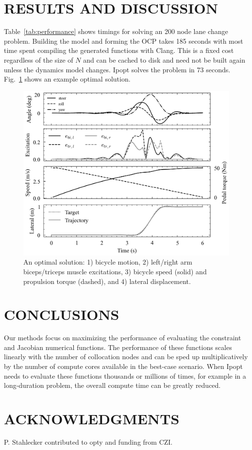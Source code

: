 \documentclass[11pt,twocolumn]{article}
\begin{document}
\section*{RESULTS AND DISCUSSION}
\vspace{-1em}
\pagestyle{empty}
%
Table~\ref{tab:performance} shows timings for solving an 200 node lane change
problem. Building the model and forming the OCP takes 185 seconds with most time
spent compiling the generated functions with Clang. This is a fixed cost
regardless of the size of \(N\) and can be cached to disk and need not be built
again unless the dynamics model changes. Ipopt solves the problem in 73 seconds.
Fig.~\ref{fig:trajectories} shows an example optimal solution.
%
\begin{figure}
    \centering
    \includegraphics[width=\linewidth]{figures/arm-muscle-bicycle-excitation.png}
    \caption{\small An optimal solution: 1) bicycle motion, 2) left/right
    arm biceps/triceps muscle excitations, 3) bicycle speed (solid) and
    propulsion torque (dashed), and 4) lateral displacement.}
    \label{fig:trajectories}
\end{figure}

\vspace{-1.5em}
\section*{CONCLUSIONS}
\vspace{-1em}
%
Our methods focus on maximizing the performance of evaluating the constraint and
Jacobian numerical functions. The performance of these functions scales linearly
with the number of collocation nodes and can be sped up multiplicatively by the
number of compute cores available in the best-case scenario. When Ipopt needs to
evaluate these functions thousands or millions of times, for example in a
long-duration problem, the overall compute time can be greatly reduced.

\vspace{-1em}



\vspace{-1em}
\section*{ACKNOWLEDGMENTS}
\vspace{-1em}
%
P. Stahlecker contributed to opty and funding from CZI.
\end{document}
